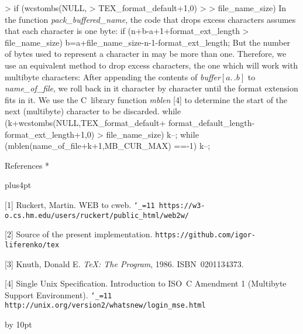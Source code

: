 > if (wcstombs(NULL,
>     TEX_format_default+1,0) >
>     file_name_size)
\endverbatim
\medskip
In the function {\it pack\_buffered\_name\/},
the code that drops excess characters
assumes that each character is one byte:
\verbatim
if (n+b-a+1+format_ext_length >
    file_name_size)
  b=a+file_name_size-n-1-format_ext_length;
\endverbatim
But the number of bytes used to represent
a character in \hbox{} may be more than one.
Therefore, we use an equivalent method to drop excess
characters, the one which will work with multibyte characters:
After appending
the contents of
{\it buffer\/$[a\mathrel{.\,.}b]$\/}
to {\it name\_of\_file\/}, we roll back in it
character by character until the
format extension fits in it. We use the C~library
function {\it mblen\/} [4] to determine
the start of the next (multibyte) character to be discarded.
\verbatim
while (k+wcstombs(NULL,TEX_format_default+
       format_default_length-
       format_ext_length+1,0) >
       file_name_size) {
  k--;
  while (mblen(name_of_file+k+1,MB_CUR_MAX)
         ==-1)
    k--;
}
\endverbatim

\head * References *

\begingroup
\vskip-1pt

\frenchspacing
\parindent=0pt
\parskip=4pt plus4pt
\def\\{\hfil\break}
\everypar{\hangindent=1.5em\relax}
\raggedright

[1] Ruckert, Martin. WEB to cweb.\\
{\tt\catcode`_=11 https://w3-o.cs.hm.edu/users/ruckert/\\public_html/web2w/}

[2] Source of the present implementation.\\
{\tt https://github.com/igor-liferenko/tex}

[3] Knuth, Donald E. {\sl \TeX: The Program\/}, 1986. ISBN~0201134373.

[4] Single Unix Specification. Introduction to ISO~C Amendment 1
(Multibyte Support Environment).\\
{\tt\catcode`_=11 http://unix.org/version2/whatsnew/\\login_mse.html}

\par\endgroup

\advance\signaturewidth by 10pt
\makesignature
\endarticle
